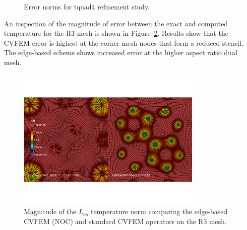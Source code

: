 \begin{figure}
  \centering
  \vspace{0.1in}
  \caption{Error norms for tquad4 refinement study.}
  \label{fig:laplaceTquad}
\end{figure}

An inspection of the magnitude of error between the exact and computed temperature for the R3 mesh is shown in Figure~\ref{fig:tquadTdiff}.
Results show that the CVFEM error is highest at the corner mesh nodes that form a reduced stencil. The edge-based scheme shows increased error
at the higher aspect ratio dual mesh. 

\begin{figure}
\centerline{\includegraphics[width=0.8\textwidth]{figures/tquadEdgeCvfemTdiff.pdf}}
\caption{Magnitude of the $L_{oo}$ temperature norm comparing the edge-based CVFEM (NOC) and standard CVFEM operators on the R3 mesh.}
\label{fig:tquadTdiff}
\end{figure}
